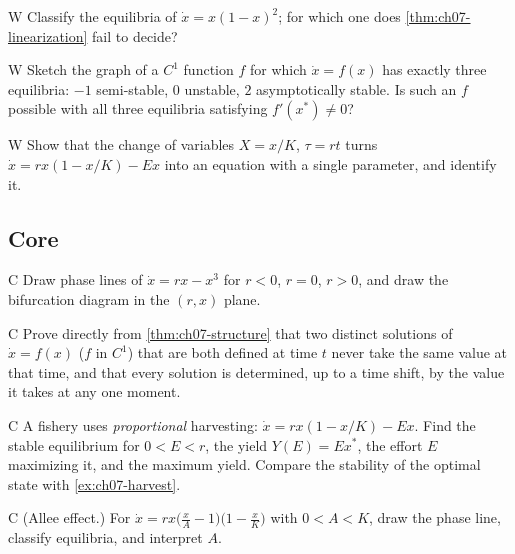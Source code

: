 \begin{problem}{W}\label{prob:ch07-w3}
Classify the equilibria of $\dot x = x(1-x)^2$; for which one does
\cref{thm:ch07-linearization} fail to decide?
\end{problem}

\begin{problem}{W}\label{prob:ch07-w4}
Sketch the graph of a $C^1$ function $f$ for which $\dot x = f(x)$ has exactly
three equilibria: $-1$ semi-stable, $0$ unstable, $2$ asymptotically stable.
Is such an $f$ possible with all three equilibria satisfying
$f'(x^*)\neq0$?
\end{problem}

\begin{problem}{W}\label{prob:ch07-w5}
Show that the change of variables $X = x/K$, $\tau = rt$ turns
$\dot x = rx(1 - x/K) - Ex$ into an equation with a single parameter, and
identify it.
\end{problem}

\subsection*{Core}

\begin{problem}{C}\label{prob:ch07-c1}
Draw phase lines of $\dot x = rx - x^3$ for $r<0$, $r = 0$, $r>0$, and draw the
bifurcation diagram in the $(r,x)$ plane.
\end{problem}

\begin{problem}{C}\label{prob:ch07-c2}
Prove directly from \cref{thm:ch07-structure} that two distinct solutions of
$\dot x = f(x)$ ($f$ in $C^1$) that are both defined at time $t$ never take the
same value at that time, and that every solution is determined, up to a time
shift, by the value it takes at any one moment.
\end{problem}

\begin{problem}{C}\label{prob:ch07-c3}
A fishery uses \emph{proportional} harvesting:
$\dot x = rx(1 - x/K) - Ex$. Find the stable equilibrium for $0<E<r$, the
yield $Y(E) = Ex^*$, the effort $E$ maximizing it, and the maximum yield.
Compare the stability of the optimal state with \cref{ex:ch07-harvest}.
\end{problem}

\begin{problem}{C}\label{prob:ch07-c4}
(Allee effect.) For $\dot x = rx\bigl(\frac xA - 1\bigr)\bigl(1 - \frac xK\bigr)$
with $0<A<K$, draw the phase line, classify equilibria, and interpret $A$.
\end{problem}

